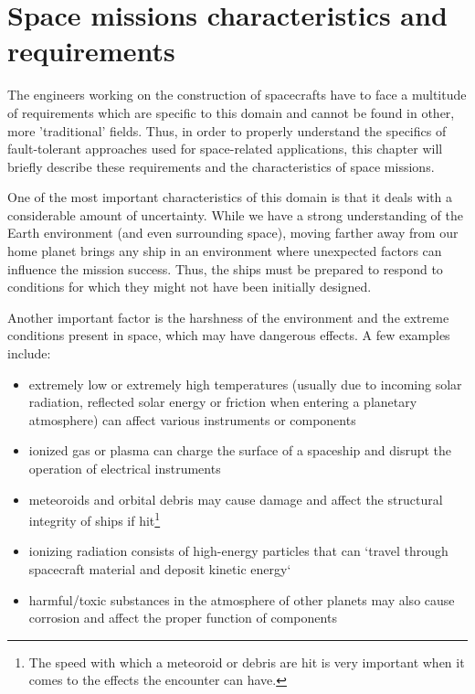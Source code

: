 \section{Space missions characteristics and requirements}
The engineers working on the construction of spacecrafts have to face a
multitude of requirements which are specific to this domain and cannot be found
in other, more 'traditional' fields. Thus, in order to properly understand the
specifics of fault-tolerant approaches used for space-related applications, this
chapter will briefly describe these requirements and the characteristics of
space missions.

One of the most important characteristics of this domain is that it deals with a
considerable amount of uncertainty. While we have a strong understanding of the
Earth environment (and even surrounding space), moving farther away from our
home planet brings any ship in an environment where unexpected factors can
influence the mission success. Thus, the ships must be prepared to respond to
conditions for which they might not have been initially designed.

Another important factor is the harshness of the environment and the extreme
conditions present in space, which may have dangerous effects. A few examples
include\cite{req-space-environment}:
\begin{itemize}
  \item extremely low or extremely high temperatures (usually due to incoming
  solar radiation, reflected solar energy or friction when entering a planetary
  atmosphere) can affect various instruments or components
  \item ionized gas or plasma can charge the surface of a spaceship and
  disrupt the operation of electrical instruments
  \item meteoroids and orbital debris may cause damage and affect the structural
  integrity of ships if hit\footnote{The speed with which a meteoroid or debris
  are hit is very important when it comes to the effects the encounter can
  have.}
  \item ionizing radiation consists of high-energy particles that can `travel
  through spacecraft material and deposit kinetic energy`
  \item harmful/toxic substances in the atmosphere of other planets may also
  cause corrosion and affect the proper function of components
\end{itemize}

